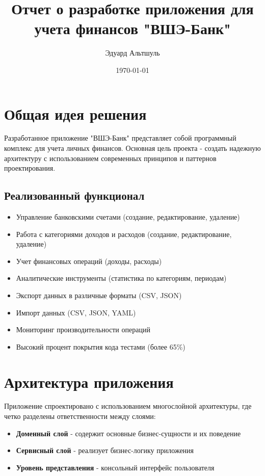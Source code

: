 \documentclass[12pt,a4paper]{article}
\title{Отчет о разработке приложения для учета финансов "ВШЭ-Банк"}
\author{Эдуард Альтшуль}
\date{\today}
\begin{document}
\maketitle

\tableofcontents
\newpage

\section{Общая идея решения}

Разработанное приложение "ВШЭ-Банк" представляет собой программный комплекс для учета личных финансов. Основная цель проекта - создать надежную архитектуру с использованием современных принципов и паттернов проектирования. 

\subsection{Реализованный функционал}
\begin{itemize}
    \item Управление банковскими счетами (создание, редактирование, удаление)
    \item Работа с категориями доходов и расходов (создание, редактирование, удаление)
    \item Учет финансовых операций (доходы, расходы)
    \item Аналитические инструменты (статистика по категориям, периодам)
    \item Экспорт данных в различные форматы (CSV, JSON)
    \item Импорт данных (CSV, JSON, YAML)
    \item Мониторинг производительности операций
    \item Высокий процент покрытия кода тестами (более 65\%)
\end{itemize}

\section{Архитектура приложения}

Приложение спроектировано с использованием многослойной архитектуры, где четко разделены ответственности между слоями:

\begin{itemize}
    \item \textbf{Доменный слой} - содержит основные бизнес-сущности и их поведение
    \item \textbf{Сервисный слой} - реализует бизнес-логику приложения
    \item \textbf{Уровень представления} - консольный интерфейс пользователя
\end{itemize}
\end{document}
